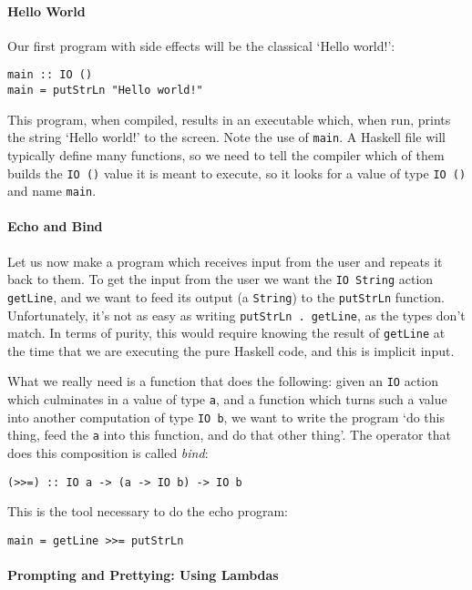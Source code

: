 \documentclass[11pt]{article}
\theoremstyle{nonumberplain}
\newcommand*\lsin{\lstinline}
\begin{document}
\paragraph{Hello World}
Our first program with side effects will be the classical `Hello world!':
\begin{lstlisting}
main :: IO ()
main = putStrLn "Hello world!"
\end{lstlisting}

This program, when compiled, results in an executable which, when run, prints the string `Hello world!' to the screen. Note the use of \lsin|main|. A Haskell file will typically define many functions, so we need to tell the compiler which of them builds the \lsin|IO ()| value it is meant to execute, so it looks for a value of type \lsin|IO ()| and name \lsin|main|.

\paragraph{Echo and Bind}
Let us now make a program which receives input from the user and repeats it back to them. To get the input from the user we want the \lsin|IO String| action \lsin|getLine|, and we want to feed its output (a \lsin|String|) to the \lsin|putStrLn| function. Unfortunately, it's not as easy as writing \lsin|putStrLn . getLine|, as the types don't match. In terms of purity, this would require knowing the result of \lsin|getLine| at the time that we are executing the pure Haskell code, and this is implicit input.

What we really need is a function that does the following: given an \lsin|IO| action which culminates in a value of type \lsin|a|, and a function which turns such a value into another computation of type \lsin|IO b|, we want to write the program `do this thing, feed the \lsin|a| into this function, and do that other thing'. The operator that does this composition is called \emph{bind}:
\begin{lstlisting}
(>>=) :: IO a -> (a -> IO b) -> IO b
\end{lstlisting}

This is the tool necessary to do the echo program:
\begin{lstlisting}
main = getLine >>= putStrLn
\end{lstlisting}

\paragraph{Prompting and Prettying: Using Lambdas}
\end{document}
